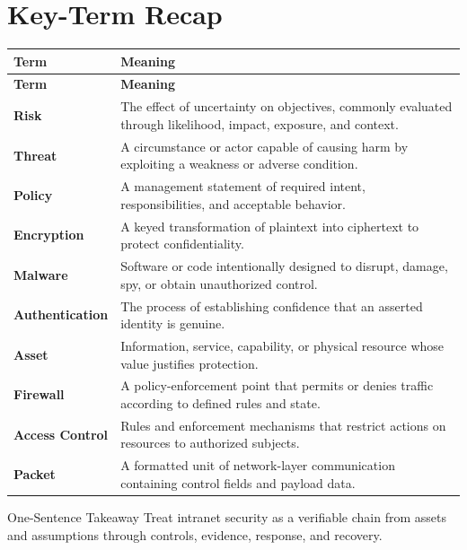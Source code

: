 \documentclass[11pt,letterpaper]{article}
\begin{document}
\section*{Key-Term Recap}
\begin{longtable}{>{\raggedright\arraybackslash}p{}>{\raggedright\arraybackslash}p{}}
\toprule\rowcolor{Navy}\color{white}\textbf{Term} & \color{white}\textbf{Meaning}\\\midrule
\endfirsthead
\toprule\rowcolor{Navy}\color{white}\textbf{Term} & \color{white}\textbf{Meaning}\\\midrule
\endhead
\textbf{Risk} & The effect of uncertainty on objectives, commonly evaluated through likelihood, impact, exposure, and context. \\\midrule
\textbf{Threat} & A circumstance or actor capable of causing harm by exploiting a weakness or adverse condition. \\\midrule
\textbf{Policy} & A management statement of required intent, responsibilities, and acceptable behavior. \\\midrule
\textbf{Encryption} & A keyed transformation of plaintext into ciphertext to protect confidentiality. \\\midrule
\textbf{Malware} & Software or code intentionally designed to disrupt, damage, spy, or obtain unauthorized control. \\\midrule
\textbf{Authentication} & The process of establishing confidence that an asserted identity is genuine. \\\midrule
\textbf{Asset} & Information, service, capability, or physical resource whose value justifies protection. \\\midrule
\textbf{Firewall} & A policy-enforcement point that permits or denies traffic according to defined rules and state. \\\midrule
\textbf{Access Control} & Rules and enforcement mechanisms that restrict actions on resources to authorized subjects. \\\midrule
\textbf{Packet} & A formatted unit of network-layer communication containing control fields and payload data. \\\midrule
\bottomrule
\end{longtable}
\begin{CornellExamBox}{One-Sentence Takeaway}
Treat intranet security as a verifiable chain from assets and assumptions through controls, evidence, response, and recovery.
\end{CornellExamBox}
\end{document}
